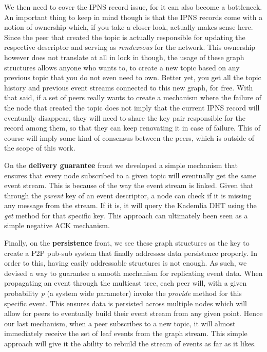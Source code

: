 We then need to cover the IPNS record issue, for it can also become a
bottleneck. An important thing to keep in mind though is that the IPNS
records come with a notion of ownership which, if you take a closer
look, actually makes sense here. Since the peer that created the topic is
actually responsible for updating the respective descriptor and serving
as \emph{rendezvous} for the network. This ownership however does not
translate at all in lock in though, the usage of these graph structures
allows anyone who wants to, to create a new topic based on any previous
topic that you do not even need to own. Better yet, you get all the
topic history and previous event streams connected to this new graph,
for free. With that said, if a set of peers really wants to create a
mechanism where the failure of the node that created the topic does not
imply that the current IPNS record will eventually disappear, they will
need to share the key pair responsible for the record among them, so
that they can keep renovating it in case of failure. This of course will
imply some kind of consensus between the peers, which is outside of the
scope of this work.

On the \textbf{delivery guarantee} front we developed a simple mechanism
that ensures that every node subscribed to a given topic will eventually
get the same event stream. This is
because of the way the event stream is linked. Given that through the
\emph{parent} key of an event descriptor, a node can check if it is
missing any message from the stream. If it is, it will query the
Kademlia DHT using the \emph{get} method for that specific key. This
approach can ultimately been seen as a simple negative
ACK mechanism.

Finally, on the \textbf{persistence} front, we see these graph
structures as the key to create a P2P pub-sub system that finally
addresses data persistence properly. In order to this, having easily
addressable structures is not enough. As such, we devised a way to
guarantee a smooth mechanism for replicating event data. When
propagating an event through the multicast tree, each peer will, with a
given probability \emph{p} (a system wide parameter) invoke the
\emph{provide} method for this specific event. This ensures data is
persisted across multiple nodes which will allow for peers to eventually
build their event stream from any given point. Hence our last mechanism,
when a peer subscribes to a new topic, it will almost immediately
receive the set of leaf events from the graph stream. This simple
approach will give it the ability to rebuild the stream of events as
far as it likes.
